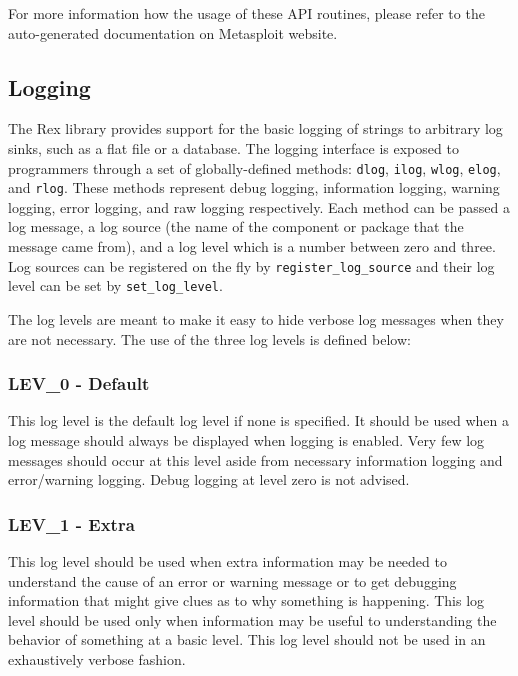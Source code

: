 \documentclass{report}
\begin{document}
\par
For more information how the usage of these API routines, please
refer to the auto-generated documentation on Metasploit website.

        \subsection{Logging}

\par
The Rex library provides support for the basic logging of strings to
arbitrary log sinks, such as a flat file or a database.  The logging
interface is exposed to programmers through a set of
globally-defined methods: \texttt{dlog}, \texttt{ilog},
\texttt{wlog}, \texttt{elog}, and \texttt{rlog}.  These methods
represent debug logging, information logging, warning logging, error
logging, and raw logging respectively.  Each method can be passed a
log message, a log source (the name of the component or package that
the message came from), and a log level which is a number between
zero and three.  Log sources can be registered on the fly by
\texttt{register\_log\_source} and their log level can be set by
\texttt{set\_log\_level}.

\par
The log levels are meant to make it easy to hide verbose log
messages when they are not necessary.  The use of the three log
levels is defined below:

            \subsubsection{LEV\_0 - Default}

This log level is the default log level if none is specified.  It
should be used when a log message should always be displayed when
logging is enabled. Very few log messages should occur at this level
aside from necessary information logging and error/warning logging.
Debug logging at level zero is not advised.

            \subsubsection{LEV\_1 - Extra}

This log level should be used when extra information may be needed
to understand the cause of an error or warning message or to get
debugging information that might give clues as to why something is
happening.  This log level should be used only when information may
be useful to understanding the behavior of something at a basic
level.  This log level should not be used in an exhaustively verbose
fashion.
\end{document}
